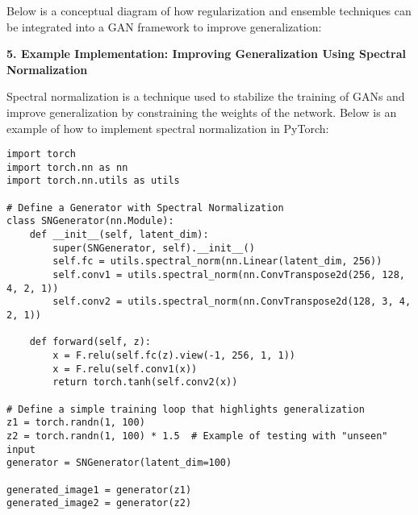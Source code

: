 Below is a conceptual diagram of how regularization and ensemble techniques can be integrated into a GAN framework to improve generalization:

\begin{center}
\end{center}

\textbf{5. Example Implementation: Improving Generalization Using Spectral Normalization}

Spectral normalization is a technique used to stabilize the training of GANs and improve generalization by constraining the weights of the network. Below is an example of how to implement spectral normalization in PyTorch:

\begin{lstlisting}[style=python]
import torch
import torch.nn as nn
import torch.nn.utils as utils

# Define a Generator with Spectral Normalization
class SNGenerator(nn.Module):
    def __init__(self, latent_dim):
        super(SNGenerator, self).__init__()
        self.fc = utils.spectral_norm(nn.Linear(latent_dim, 256))
        self.conv1 = utils.spectral_norm(nn.ConvTranspose2d(256, 128, 4, 2, 1))
        self.conv2 = utils.spectral_norm(nn.ConvTranspose2d(128, 3, 4, 2, 1))
    
    def forward(self, z):
        x = F.relu(self.fc(z).view(-1, 256, 1, 1))
        x = F.relu(self.conv1(x))
        return torch.tanh(self.conv2(x))

# Define a simple training loop that highlights generalization
z1 = torch.randn(1, 100)
z2 = torch.randn(1, 100) * 1.5  # Example of testing with "unseen" input
generator = SNGenerator(latent_dim=100)

generated_image1 = generator(z1)
generated_image2 = generator(z2)
\end{lstlisting}

